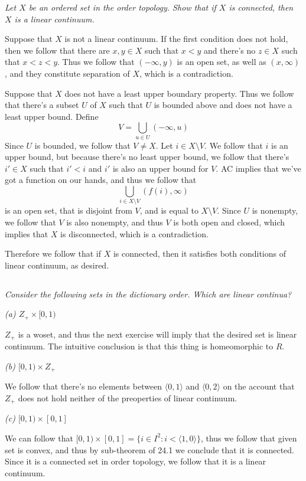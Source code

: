 \documentclass[11pt,oneside,titlepage]{book}
\newcommand{\eangle}[1]{\langle #1 \rangle}
\newcommand{\set}[1]{\{ #1 \}}
\begin{document}
\textit{Let $X$ be an ordered set in the order topology. Show that if $X$ is connected, then
  $X$ is a linear continuum.}

Suppose that $X$ is not a linear continuum. If the first condition does not hold,
then we follow that there are $x, y \in X$ such that $x < y$ and there's no $z \in X$
such that $x < z < y$. Thus we follow that $(-\infty, y)$ is an open set,
as well as $(x, \infty)$, and they constitute separation of $X$, which is a contradiction.

Suppose that $X$ does not have a least upper boundary property. Thus we follow that
there's a subset $U$ of $X$ such that $U$ is bounded above and does not have a least upper bound.
Define
$$V = \bigcup_{u \in U}{(-\infty, u)}$$
Since $U$ is bounded, we follow that $V \neq X$. Let $i \in X \setminus V$. We follow that $i$
is an upper bound, but because there's no least upper bound, we follow that there's $i' \in X$
such that $i' < i$ and $i'$ is also an upper bound for $V$. AC implies that we've got a
function on our hands, and thus we follow that
$$\bigcup_{i \in X \setminus V}{(f(i), \infty)}$$
is an open set, that is disjoint from $V$, and is equal to $X \setminus V$.
Since $U$ is nonempty, we follow that $V$ is also nonempty, and thus $V$ is both open
and closed, which implies that $X$ is disconnected, which is a contradiction.

Therefore we follow that if $X$ is connected, then it satisfies both conditions of linear
continuum, as desired.

\subsection{}

\textit{Consider the following sets in the dictionary order. Which are linear
  continua?}

\textit{(a) $Z_+ \times [0, 1)$}

$Z_+$ is a woset, and thus the next exercise will imply that the desired set is linear
continuum. The intuitive conclusion is that this thing is homeomorphic to $R$.

\textit{(b) $[0, 1) \times Z_+$}

We follow that there's no elements between $\eangle{0, 1}$ and $\eangle{0, 2}$
on the account that $Z_+$ does not hold neither of the preoperties of
linear continuum.

\textit{(c) $[0, 1) \times [0, 1]$}

We can follow that $[0, 1) \times [0, 1] = \set{i \in I^2: i < \eangle{1, 0}}$, thus we
follow that given set is convex, and thus by sub-theorem of 24.1 we conclude that it
is connected. Since it is a connected set in order topology, we follow that it is
a linear continuum.
\end{document}
